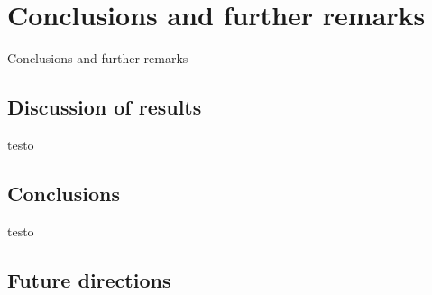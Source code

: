 \setchapterpreamble[u]{\margintoc}
\chapter{Conclusions and further remarks}

Conclusions and further remarks

\section{Discussion of results} 

testo


\section{Conclusions} 

testo


\section{Future directions} 






